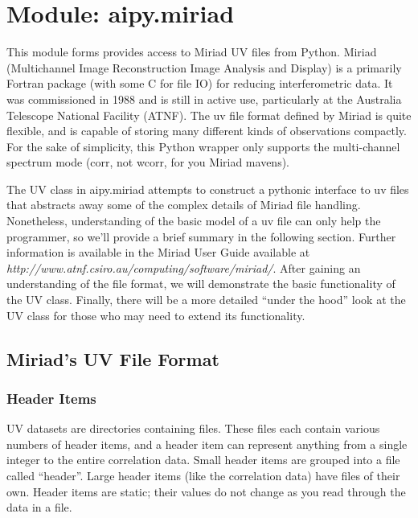 \section{Module: aipy.miriad}
\label{sec:intro}

This module forms provides access to Miriad UV files from Python.  Miriad
(Multichannel Image Reconstruction Image Analysis and Display) is
a primarily Fortran package (with some C for file IO) for reducing
interferometric data.  It was commissioned in 1988 and is still in active
use, particularly at the Australia Telescope National Facility (ATNF).  The 
uv file format defined by Miriad is quite flexible, and is capable of storing
many different kinds of observations compactly.  For the sake of simplicity,
this Python wrapper only supports the multi-channel spectrum mode (corr,
not wcorr, for you Miriad mavens).  

The UV class in aipy.miriad attempts to construct a pythonic interface to uv
files that abstracts away some of the complex details of Miriad file handling.
Nonetheless, understanding of the basic model of a uv file can only help the
programmer, so we'll provide a brief summary in the following section.  Further
information is available in the Miriad User Guide available at {\it
http://www.atnf.csiro.au/computing/software/miriad/}.  After gaining an
understanding of the file format, we will demonstrate the basic functionality
of the UV class.  Finally, there will be a more detailed ``under the hood''
look at the UV class for those who may need to extend its functionality.

\subsection{Miriad's UV File Format}

\subsubsection{Header Items}
UV datasets are directories containing files.  These files each contain
various numbers of header items, and a header item can represent anything from
a single integer to the entire correlation data.  Small header items are
grouped into a file called ``header''.  Large header items (like the
correlation data) have files of their own.  Header items are static;
their values do not change as you read through the data in a file.

